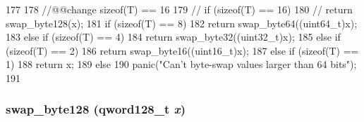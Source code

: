 \begin{DoxyCode}
177                         {
178   //@@change sizeof(T) == 16 
179   //  if (sizeof(T) == 16)
180   //      return swap_byte128(x);
181     if (sizeof(T) == 8)
182         return swap_byte64((uint64_t)x);
183     else if (sizeof(T) == 4)
184         return swap_byte32((uint32_t)x);
185     else if (sizeof(T) == 2)
186         return swap_byte16((uint16_t)x);
187     else if (sizeof(T) == 1)
188         return x;
189     else
190         panic("Can't byte-swap values larger than 64 bits");
191 }
\end{DoxyCode}
\hypertarget{byteswap_8hh_a2d35467856f0684a26fd9a0a69f88456}{
\subsubsection[{swap\_\-byte128}]{ swap\_\-byte128 ({\bf qword128\_\-t} {\em x})}}
\label{byteswap_8hh_a2d35467856f0684a26fd9a0a69f88456}



